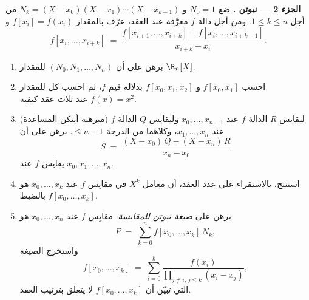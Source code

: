 \begin{problem}
\medskip
\noindent\textbf{الجزء 2 ---  نيوتن .} ضع $N_0 = 1$ و $N_k = (X - x_0)(X - x_1) \cdots
(X - x_{k-1})$ من أجل $1 \leq k \leq n$. ومن أجل دالة $f$ معرَّفة
عند العقد، عرّف \emph{} بالمقدار
$f[x_i] = f(x_i)$ و
\[
f[x_i, \dots, x_{i+k}] \;=\;
\frac{f[x_{i+1}, \dots, x_{i+k}] - f[x_i, \dots, x_{i+k-1}]}
{x_{i+k} - x_i} .
\]
\begin{enumerate}[resume]
  \item برهن على أن $(N_0, N_1, \dots, N_n)$  للمقدار
        $\R_n[X]$.
  \item احسب $f[x_0, x_1]$ و $f[x_0, x_1, x_2]$ بدلالة
        قيم $f$، ثم احسب كل  للمقدار
        $f(x) = x^2$ عند ثلاث عقد كيفية.
  \item (مبرهنة أيتكن المساعدة) ليقايس $R$ الدالةَ $f$ عند $x_0, \dots,
        x_{n-1}$ وليقايس $Q$ الدالةَ $f$ عند $x_1, \dots, x_n$،
        وكلاهما من الدرجة $\leq n - 1$. برهن على أن
        \[
        S \;=\; \frac{(X - x_0)\,Q - (X - x_n)\,R}{x_n - x_0}
        \]
        يقايس $f$ عند $x_0, x_1, \dots, x_n$.
  \item استنتج، بالاستقراء على عدد العقد، أن
        معامل $X^{k}$ في مقايِس $f$ عند $x_0,
        \dots, x_k$ هو بالضبط $f[x_0, \dots, x_k]$.
  \item برهن على \emph{صيغة نيوتن للمقايسة}: مقايِس $f$
        عند $x_0, \dots, x_n$ هو
        \[
        P \;=\; \sum_{k=0}^{n} f[x_0, \dots, x_k]\, N_k ,
        \]
        واستخرج الصيغة 
        \[
        f[x_0, \dots, x_k] \;=\; \sum_{i=0}^{k}
        \frac{f(x_i)}{\prod_{j \neq i,\, j \leq k} (x_i - x_j)} ,
        \]
        التي تبيّن أن $f[x_0, \dots, x_k]$ لا يتعلق
        بترتيب العقد.
\end{enumerate}


\end{problem}
